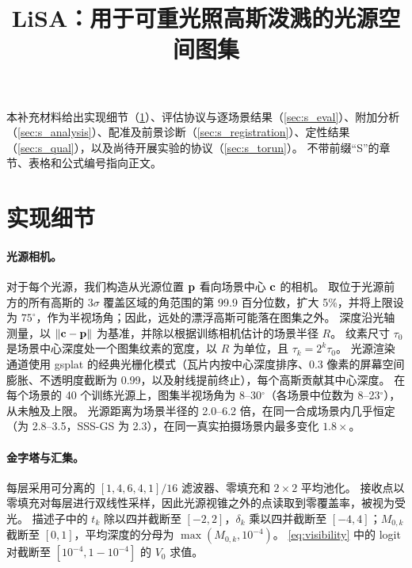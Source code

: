 \documentclass[10pt,twocolumn,letterpaper]{article}
\title{LiSA：用于可重光照高斯泼溅的光源空间图集}
\begin{document}
\maketitlesupplementary
\renewcommand{\thesection}{S\arabic{section}}
\renewcommand{\thetable}{S\arabic{table}}
\renewcommand{\thefigure}{S\arabic{figure}}
\renewcommand{\theequation}{S\arabic{equation}}


本补充材料给出实现细节（\cref{sec:s_impl}）、评估协议与逐场景结果（\cref{sec:s_eval}）、附加分析（\cref{sec:s_analysis}）、配准及前景诊断（\cref{sec:s_registration}）、定性结果（\cref{sec:s_qual}），以及尚待开展实验的协议（\cref{sec:s_torun}）。
不带前缀“S”的章节、表格和公式编号指向正文。

\section{实现细节}
\label{sec:s_impl}

\paragraph{光源相机。}
对于每个光源，我们构造从光源位置 $\mathbf{p}$ 看向场景中心 $\mathbf{c}$ 的相机。
取位于光源前方的所有高斯的 $3\sigma$ 覆盖区域的角范围的第 99.9 百分位数，扩大 5\%，并将上限设为 $75^\circ$，作为半视场角；因此，远处的漂浮高斯可能落在图集之外。
深度沿光轴测量，以 $\|\mathbf{c}-\mathbf{p}\|$ 为基准，并除以根据训练相机估计的场景半径 $R$。
纹素尺寸 $\tau_0$ 是场景中心深度处一个图集纹素的宽度，以 $R$ 为单位，且 $\tau_k=2^k\tau_0$。
光源渲染通道使用 gsplat 的经典光栅化模式（瓦片内按中心深度排序、0.3 像素的屏幕空间膨胀、不透明度截断为 0.99，以及射线提前终止），每个高斯贡献其中心深度。
在每个场景的 40 个训练光源上，图集半视场角为 8--30$^\circ$（各场景中位数为 8--23$^\circ$），从未触及上限。
光源距离为场景半径的 2.0--6.2 倍，在同一合成场景内几乎恒定（\gsthree 为 2.8--3.5，SSS-GS 为 2.3），在同一真实拍摄场景内最多变化 $1.8\times$。

\paragraph{金字塔与汇集。}
每层采用可分离的 $[1,4,6,4,1]/16$ 滤波器、零填充和 $2\times2$ 平均池化。
接收点以零填充对每层进行双线性采样，因此光源视锥之外的点读取到零覆盖率，被视为受光。
描述子中的 $t_k$ 除以四并截断至 $[-2,2]$，$\delta_k$ 乘以四并截断至 $[-4,4]$；$M_{0,k}$ 截断至 $[0,1]$，平均深度的分母为 $\max(M_{0,k},10^{-4})$。
\cref{eq:visibility} 中的 logit 对截断至 $[10^{-4},1-10^{-4}]$ 的 $V_0$ 求值。
\end{document}
